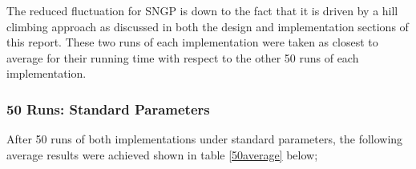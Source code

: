 \documentclass[a4paper,10.5pt]{article}
\makeatletter
\newenvironment{customlegend}[1][]{%
    \begingroup
    \pgfplots@init@cleared@structures
    \pgfplotsset{#1}%
}{%
    \pgfplots@createlegend
    \endgroup
}%
\def\addlegendimage{\pgfplots@addlegendimage}
\makeatother
\begin{document}
\begin{figure}[H]
\centering
\hspace*{4em}
\end{figure}
The reduced fluctuation for SNGP is down to the fact that it is driven by a hill climbing approach as discussed in both the design and implementation sections of this report. 
These two runs of each implementation were taken as closest to average for their running time with respect to the other 50 runs of each implementation. 

\subsubsection{50 Runs: Standard Parameters}
After 50 runs of both implementations under standard parameters, the following average results were achieved shown in table \ref{50average} below;
\end{document}
